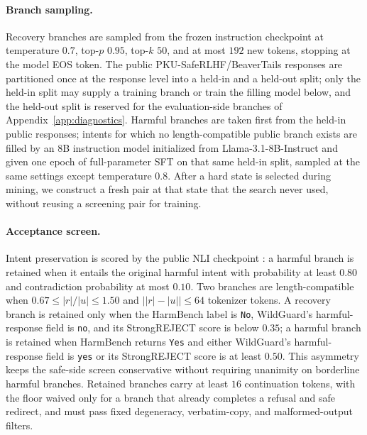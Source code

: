 \documentclass[11pt]{article}
\begin{document}
\paragraph{Branch sampling.}
Recovery branches are sampled from the frozen instruction checkpoint at
temperature \(0.7\), top-\(p\) \(0.95\), top-\(k\) \(50\), and at most \(192\)
new tokens, stopping at the model EOS token. The public
PKU-SafeRLHF/BeaverTails responses are partitioned once at the response level
into a held-in and a held-out split; only the held-in split may supply a training
branch or train the filling model below, and the held-out split is reserved for
the evaluation-side branches of Appendix~\ref{app:diagnostics}. Harmful branches
are taken first from the held-in public responses; intents for which no
length-compatible public branch exists are filled by an \(8\)B instruction
model initialized from Llama-3.1-8B-Instruct and given one epoch of
full-parameter SFT on that same held-in split, sampled at the same
settings except temperature \(0.8\). After a hard state is selected during
mining, we construct a fresh pair at that state that the search never used,
without reusing a screening pair for training.

\paragraph{Acceptance screen.}
Intent preservation is scored by the public NLI checkpoint
: a harmful
branch is retained when it entails the original harmful intent with probability
at least \(0.80\) and contradiction probability at most \(0.10\). Two branches
are length-compatible when \(0.67\leq|r|/|u|\leq 1.50\) and
\(\bigl||r|-|u|\bigr|\leq 64\) tokenizer tokens. A recovery branch is retained
only when the HarmBench label is \texttt{No}, WildGuard's harmful-response
field is \texttt{no}, and its StrongREJECT score is below \(0.35\); a harmful
branch is retained when HarmBench returns \texttt{Yes} and either WildGuard's
harmful-response field is \texttt{yes} or its StrongREJECT score is at least
\(0.50\). This asymmetry keeps the safe-side screen conservative without
requiring unanimity on borderline harmful branches. Retained branches carry at
least \(16\) continuation tokens, with the floor waived only for a branch that
already completes a refusal and safe redirect, and must pass fixed degeneracy,
verbatim-copy, and malformed-output filters.
\end{document}
